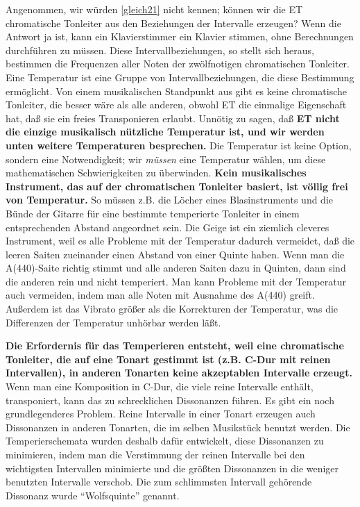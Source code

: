 Angenommen, wir würden \hyperref[gleich21]{\autoref{gleich21}} nicht kennen; können wir die ET chromatische Tonleiter aus den Beziehungen der Intervalle erzeugen?
Wenn die Antwort ja ist, kann ein Klavierstimmer ein Klavier stimmen, ohne Berechnungen durchführen zu müssen.
Diese Intervallbeziehungen, so stellt sich heraus, bestimmen die Frequenzen aller Noten der zwölfnotigen chromatischen Tonleiter.
Eine Temperatur ist eine Gruppe von Intervallbeziehungen, die diese Bestimmung ermöglicht.
Von einem musikalischen Standpunkt aus gibt es keine chromatische Tonleiter, die besser wäre als alle anderen, obwohl ET die einmalige Eigenschaft hat, daß sie ein freies Transponieren erlaubt.
Unnötig zu sagen, daß \textbf{ET nicht die einzige musikalisch nützliche Temperatur ist, und wir werden unten weitere Temperaturen besprechen.}
Die Temperatur ist keine Option, sondern eine Notwendigkeit; wir \textit{müssen} eine Temperatur wählen, um diese mathematischen Schwierigkeiten zu überwinden.
\textbf{Kein musikalisches Instrument, das auf der chromatischen Tonleiter basiert, ist völlig frei von Temperatur.}
So müssen z.B. die Löcher eines Blasinstruments und die Bünde der Gitarre für eine bestimmte temperierte Tonleiter in einem entsprechenden Abstand angeordnet sein.
Die Geige ist ein ziemlich cleveres Instrument, weil es alle Probleme mit der Temperatur dadurch vermeidet, daß die leeren Saiten zueinander einen Abstand von einer Quinte haben.
Wenn man die A(440)-Saite richtig stimmt und alle anderen Saiten dazu in Quinten, dann sind die anderen rein und nicht temperiert.
Man kann Probleme mit der Temperatur auch vermeiden, indem man alle Noten mit Ausnahme des A(440) greift.
Außerdem ist das Vibrato größer als die Korrekturen der Temperatur, was die Differenzen der Temperatur unhörbar werden läßt.

\textbf{Die Erfordernis für das Temperieren entsteht, weil eine chromatische Tonleiter, die auf eine Tonart gestimmt ist (z.B. C-Dur mit reinen Intervallen), in anderen Tonarten keine akzeptablen Intervalle erzeugt.}
Wenn man eine Komposition in C-Dur, die viele reine Intervalle enthält, transponiert, kann das zu schrecklichen Dissonanzen führen.
Es gibt ein noch grundlegenderes Problem.
Reine Intervalle in einer Tonart erzeugen auch Dissonanzen in anderen Tonarten, die im selben Musikstück benutzt werden.
Die Temperierschemata wurden deshalb dafür entwickelt, diese Dissonanzen zu minimieren, indem man die Verstimmung der reinen Intervalle bei den wichtigsten Intervallen minimierte und die größten Dissonanzen in die weniger benutzten Intervalle verschob.
Die zum schlimmsten Intervall gehörende Dissonanz wurde \enquote{Wolfsquinte} genannt.

